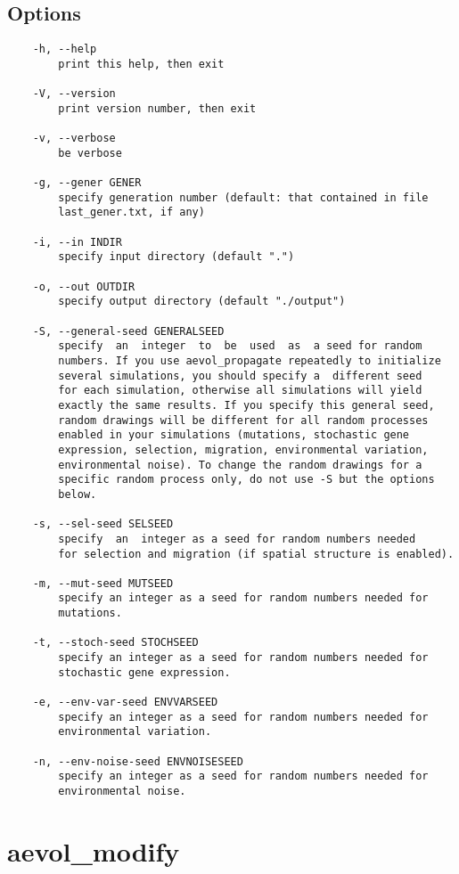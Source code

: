 \subsection*{Options}
\begin{verbatim}
	-h, --help
	  	print this help, then exit

	-V, --version
	    print version number, then exit

	-v, --verbose
	    be verbose

	-g, --gener GENER
	    specify generation number (default: that contained in file 
	    last_gener.txt, if any)

	-i, --in INDIR
	    specify input directory (default ".")

	-o, --out OUTDIR
	    specify output directory (default "./output")

	-S, --general-seed GENERALSEED
	    specify  an  integer  to  be  used  as  a seed for random 
	    numbers. If you use aevol_propagate repeatedly to initialize
	    several simulations, you should specify a  different seed
	    for each simulation, otherwise all simulations will yield 
	    exactly the same results. If you specify this general seed,
	    random drawings will be different for all random processes 
	    enabled in your simulations (mutations, stochastic gene 
	    expression, selection, migration, environmental variation, 
	    environmental noise). To change the random drawings for a 
	    specific random process only, do not use -S but the options 
	    below.

	-s, --sel-seed SELSEED
	    specify  an  integer as a seed for random numbers needed 
	    for selection and migration (if spatial structure is enabled).

	-m, --mut-seed MUTSEED
	    specify an integer as a seed for random numbers needed for 
	    mutations.

	-t, --stoch-seed STOCHSEED
	    specify an integer as a seed for random numbers needed for
	    stochastic gene expression.

	-e, --env-var-seed ENVVARSEED
	    specify an integer as a seed for random numbers needed for 
	    environmental variation.

	-n, --env-noise-seed ENVNOISESEED
	    specify an integer as a seed for random numbers needed for 
	    environmental noise.

\end{verbatim}

\newpage


\section{aevol\_modify}
\label{sec:aevol-modify}

